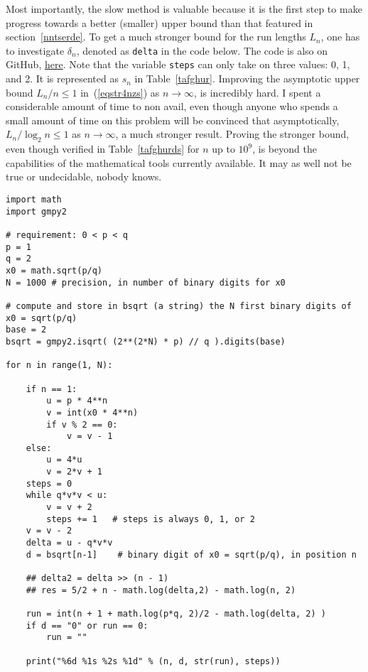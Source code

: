 \documentclass[oneside,10pt]{book}
\begin{document}
\noindent Most
 importantly, the slow method is valuable because it is the first step to make progress towards a better (smaller) upper bound than
 that featured in section~\ref{nntserde}. To get a much stronger bound for the run lengths $L_n$,
 one has to investigate $\delta_n$, denoted as \texttt{delta} in the code below. The code is also
on GitHub, \href{https://github.com/VincentGranville/Experimental-Math-Number-Theory/blob/main/Source-Code/max_runs_slow.py}{here}.
Note that the variable \texttt{steps} can only take on three values: 0, 1, and 2. It is represented as $s_n$ in Table~\ref{tafghur}. Improving
 the asymptotic upper bound $L_n/n \leq 1$ in~(\ref{eqstr4nzs}) as $n\rightarrow\infty$, is incredibly hard. I spent a considerable amount of time to non avail, even though anyone who spends a small amount of time on this problem will be convinced that  asymptotically, $L_n/\log_2 n \leq 1$
 as $n\rightarrow\infty$, a much stronger result.
 Proving the stronger bound, even though verified in Table~\ref{tafghurds} for $n$ up to $10^9$,  is beyond the capabilities of the mathematical tools currently available. It may as well not be true or undecidable, nobody knows.
 \vspace{1ex}




\begin{lstlisting}
import math
import gmpy2

# requirement: 0 < p < q
p = 1 
q = 2 
x0 = math.sqrt(p/q)
N = 1000 # precision, in number of binary digits for x0 

# compute and store in bsqrt (a string) the N first binary digits of x0 = sqrt(p/q)
base = 2
bsqrt = gmpy2.isqrt( (2**(2*N) * p) // q ).digits(base) 

for n in range(1, N):

    if n == 1:
        u = p * 4**n  
        v = int(x0 * 4**n) 
        if v % 2 == 0:
            v = v - 1
    else: 
        u = 4*u
        v = 2*v + 1
    steps = 0
    while q*v*v < u:
        v = v + 2
        steps += 1   # steps is always 0, 1, or 2
    v = v - 2
    delta = u - q*v*v 
    d = bsqrt[n-1]    # binary digit of x0 = sqrt(p/q), in position n 
    
    ## delta2 = delta >> (n - 1)
    ## res = 5/2 + n - math.log(delta,2) - math.log(n, 2)

    run = int(n + 1 + math.log(p*q, 2)/2 - math.log(delta, 2) ) 
    if d == "0" or run == 0:
        run = "" 

    print("%6d %1s %2s %1d" % (n, d, str(run), steps))
\end{lstlisting}
\end{document}
